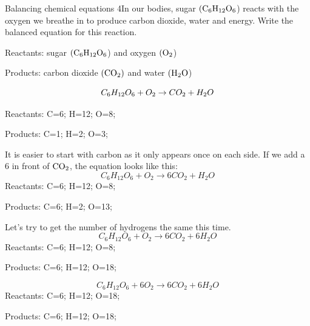 \begin{wex}{Balancing chemical equations 4}{In our bodies, sugar $\rm{(C_{6}H_{12}O_{6}}$) reacts with the oxygen we breathe in to produce carbon dioxide, water and energy. Write the balanced equation for this reaction.\\}

{
Reactants: sugar $\rm{(C_{6}H_{12}O_{6}}$) and oxygen $\rm{( O_{2}}$)

Products: carbon dioxide $\rm{(CO_{2})}$ and water $\rm{(H_{2}O}$)\\
}
{
    \begin{equation*}
    C_{6}H_{12}O_{6} + O_{2} \rightarrow CO_{2} + H_{2}O\\
    \end{equation*}
}
{
   Reactants: C=6; H=12; O=8;

   Products: C=1; H=2; O=3;\\
}
{
   It is easier to start with carbon as it only appears once on each side. If we add a 6 in front of $\rm{CO_{2}}$, the equation looks like this:
    \begin{equation*}
    C_{6}H_{12}O_{6} + O_{2} \rightarrow 6CO_{2} + H_{2}O
    \end{equation*}
   Reactants: C=6; H=12; O=8;

   Products: C=6; H=2; O=13;\\
}
{
Let's try to get the number of hydrogens the same this time.
   \begin{equation*}
    C_{6}H_{12}O_{6} + O_{2} \rightarrow 6CO_{2} + 6H_{2}O
    \end{equation*}
   Reactants: C=6; H=12; O=8;

   Products: C=6; H=12; O=18;\\
}
{
   \begin{equation*}
    C_{6}H_{12}O_{6} + 6O_{2} \rightarrow 6CO_{2} + 6H_{2}O
    \end{equation*}
   Reactants: C=6; H=12; O=18;

   Products: C=6; H=12; O=18;\\
}
\end{wex}
